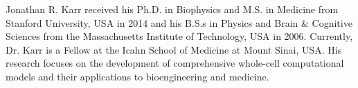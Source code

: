 \documentclass[journal,transmag,twoside]{IEEEtran}
\begin{document}
\begin{IEEEbiography}{Jonathan R. Karr}
received his Ph.D. in Biophysics and M.S. in Medicine from Stanford University, USA in 2014 and his B.S.s in Physics and Brain \& Cognitive Sciences from the Massachusetts Institute of Technology, USA in 2006. Currently, Dr. Karr is a Fellow at the Icahn School of Medicine at Mount Sinai, USA. His research focuses on the development of comprehensive whole-cell computational models and their applications to bioengineering and medicine.
\end{IEEEbiography}

\vfill
\end{document}
